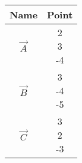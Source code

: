 \begin{tabular}[12pt]{ |c| c|}
    \hline
    \textbf{Name} & \textbf{Point}\\ 
    \hline
	$\vec{A}$ & \myvec{2\\3\\-4}\\
    \hline
    $\vec{B}$ & \myvec{3\\-4\\-5}\\
    \hline
    $\vec{C}$ & \myvec{3\\2\\-3}\\
    \hline
\end{tabular}